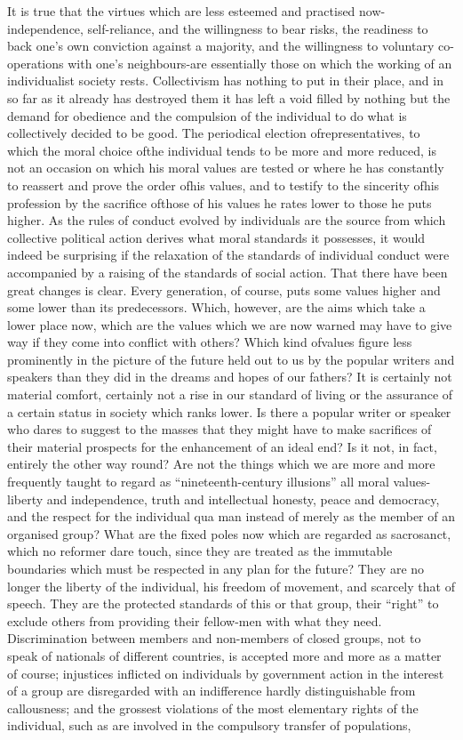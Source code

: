\documentclass[11pt,openany]{book}
\begin{document}
It is true that the virtues which are less esteemed and practised now-independence, self-reliance, and the willingness to bear risks, the readiness to back one's own conviction against a majority, and the willingness to voluntary co-operations with one's neighbours-are essentially those on which the working of an individualist society rests. Collectivism has nothing to put in their place, and in so far as it already has destroyed them it has left a void filled by nothing but the demand for obedience and the compulsion of the individual to do what is collectively decided to be good. The periodical election ofrepresentatives, to which the moral choice ofthe individual tends to be more and more reduced, is not an occasion on which his moral values are tested or where he has constantly to reassert and prove the order ofhis values, and to testify to the sincerity ofhis profession by the sacrifice ofthose of his values he rates lower to those he puts higher. As the rules of conduct evolved by individuals are the source from which collective political action derives what moral standards it possesses, it would indeed be surprising if the relaxation of the standards of individual conduct were accompanied by a raising of the standards of social action. That there have been great changes is clear. Every generation, of course, puts some values higher and some lower than its predecessors. Which, however, are the aims which take a lower place now, which are the values which we are now warned may have to give way if they come into conflict with others? Which kind ofvalues figure less prominently in the picture of the future held out to us by the popular writers and speakers than they did in the dreams and hopes of our fathers? It is certainly not material comfort, certainly not a rise in our standard of living or the assurance of a certain status in society which ranks lower. Is there a popular writer or speaker who dares to suggest to the masses that they might have to make sacrifices of their material prospects for the enhancement of an ideal end? Is it not, in fact, entirely the other way round? Are not the things which we are more and more frequently taught to regard as ``nineteenth-century illusions'' all moral values-liberty and independence, truth and intellectual honesty, peace and democracy, and the respect for the individual qua man instead of merely as the member of an organised group? What are the fixed poles now which are regarded as sacrosanct, which no reformer dare touch, since they are treated as the immutable boundaries which must be respected in any plan for the future? They are no longer the liberty of the individual, his freedom of movement, and scarcely that of speech. They are the protected standards of this or that group, their ``right'' to exclude others from providing their fellow-men with what they need. Discrimination between members and non-members of closed groups, not to speak of nationals of different countries, is accepted more and more as a matter of course; injustices inflicted on individuals by government action in the interest of a group are disregarded with an indifference hardly distinguishable from callousness; and the grossest violations of the most elementary rights of the individual, such as are involved in the compulsory transfer of populations, 
\end{document}
